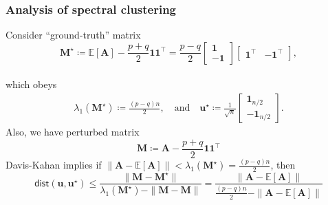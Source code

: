 \documentclass[compress,
mathserif,wide,%
]{beamer}
\begin{document}
\begin{frame}
\frametitle{Analysis of spectral clustering}
Consider ``ground-truth'' matrix
\[
\bm{M}^{\star}\coloneqq\mathbb{E}[\bm{A}]-\frac{p+q}{2}\bm{1}\bm{1}^{\top}=\frac{p-q}{2}\left[\begin{array}{c}
\bm{1}\\
-\bm{1}
\end{array}\right]\left[\begin{array}{cc}
\bm{1}^{\top} & -\bm{1}^{\top}\end{array}\right], 
\] \\
which obeys 
\begin{align*}
	\lambda_{1}(\bm{M}^{\star})\coloneqq\frac{(p-q)n}{2},  
	\quad \text{and} \quad
	\bm{u}^{\star}  \coloneqq \frac{1}{\sqrt{n}}
	\left[\begin{array}{c}
		\bm{1}_{n/2}\\
		-\bm{1}_{n/2}
	\end{array}\right].
\end{align*}
Also, we have perturbed matrix
\[
\bm{M}\coloneqq \bm{A}-\frac{p+q}{2}\bm{1}\bm{1}^{\top}
\]
\vfill
Davis-Kahan implies if $\|\bm{A}-\mathbb{E}[\bm{A}]\| < \lambda_{1}(\bm{M}^{\star})=\frac{(p-q)n}{2}$, then 
%
\begin{equation}
	\label{eq:DK-SBM}
	\mathsf{dist}( {\bm{u}}, \bm{u}^{\star}) \leq\frac{\|{\bm{M}} - \bm{M}^{\star}\|}{\lambda_{1}(\bm{M}^{\star})-\|{\bm{M}} - \bm{M}\|}=\frac{\|\bm{A}-\mathbb{E}[\bm{A}]\|}{\frac{(p-q)n}{2}-\|\bm{A}-\mathbb{E}[\bm{A}]\|}
\end{equation}

%
%
%

	
\end{frame}
\end{document}
